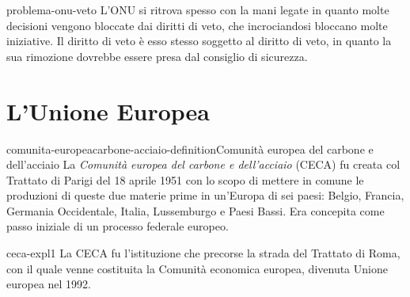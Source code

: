 \documentclass[preview]{standalone}
\begin{document}
\begin{snippet}{problema-onu-veto}
    L'ONU si ritrova spesso con la mani legate in quanto
    molte decisioni vengono bloccate dai diritti di veto, che incrociandosi
    bloccano molte iniziative.
    Il diritto di veto è esso stesso soggetto al diritto di veto, in quanto
    la sua rimozione dovrebbe essere presa dal consiglio di sicurezza.
\end{snippet}

\section{L'Unione Europea}

\begin{snippetdefinition}{comunita-europeacarbone-acciaio-definition}{Comunità europea del carbone e dell'acciaio}
    La \textit{Comunità europea del carbone e dell'acciaio} (CECA)
    fu creata col Trattato di Parigi del 18 aprile 1951
    con lo scopo di mettere in comune le produzioni di queste due materie prime in un'Europa
    di sei paesi: Belgio, Francia, Germania Occidentale, Italia, Lussemburgo e Paesi Bassi.
    Era concepita come passo iniziale di un processo federale europeo.
\end{snippetdefinition}

\begin{snippet}{ceca-expl1}
    La CECA fu l'istituzione che precorse
    la strada del Trattato di Roma, con il quale venne
    costituita la Comunità economica europea, divenuta Unione europea nel 1992.
\end{snippet}
\end{document}
